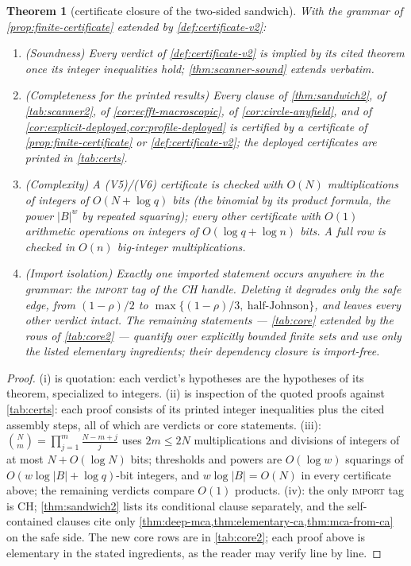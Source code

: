 \documentclass[11pt]{article}
\newtheorem{theorem}{Theorem}[section]
\theoremstyle{definition}
\theoremstyle{remark}
\newcommand{\B}{B}
\begin{document}
\begin{theorem}[certificate closure of the two-sided sandwich]\label{thm:T7-closure}
With the grammar of \cref{prop:finite-certificate} extended by \cref{def:certificate-v2}:
\begin{enumerate}[label=\textup{(\roman*)}]
\item \textup(Soundness\textup) Every verdict of \cref{def:certificate-v2} is implied by its cited theorem once its integer inequalities hold; \cref{thm:scanner-sound} extends verbatim.
\item \textup(Completeness for the printed results\textup) Every clause of \cref{thm:sandwich2}, of \cref{tab:scanner2}, of \cref{cor:ecfft-macroscopic}, of \cref{cor:circle-anyfield}, and of \cref{cor:explicit-deployed,cor:profile-deployed} is certified by a certificate of \cref{prop:finite-certificate} or \cref{def:certificate-v2}; the deployed certificates are printed in \cref{tab:certs}.
\item \textup(Complexity\textup) A \textup{(V5)}/\textup{(V6)} certificate is checked with $O(N)$ multiplications of integers of $O(N+\log q)$ bits \textup(the binomial by its product formula, the power $|\B|^w$ by repeated squaring\textup); every other certificate with $O(1)$ arithmetic operations on integers of $O(\log q+\log n)$ bits. A full row is checked in $O(n)$ big-integer multiplications.
\item \textup(Import isolation\textup) Exactly one imported statement occurs anywhere in the grammar: the \textup{\textsc{import}} tag of the CH handle. Deleting it degrades only the safe edge, from $(1-\rho)/2$ to $\max\{(1-\rho)/3,\ \text{half-Johnson}\}$, and leaves every other verdict intact. The remaining statements --- \cref{tab:core} extended by the rows of \cref{tab:core2} --- quantify over explicitly bounded finite sets and use only the listed elementary ingredients; their dependency closure is import-free.
\end{enumerate}
\end{theorem}

\begin{proof}
(i) is quotation: each verdict's hypotheses are the hypotheses of its theorem, specialized to integers. (ii) is inspection of the quoted proofs against \cref{tab:certs}: each proof consists of its printed integer inequalities plus the cited assembly steps, all of which are verdicts or core statements. (iii): $\binom Nm=\prod_{j=1}^m\frac{N-m+j}j$ uses $2m\le2N$ multiplications and divisions of integers of at most $N+O(\log N)$ bits; thresholds and powers are $O(\log w)$ squarings of $O(w\log|\B|+\log q)$-bit integers, and $w\log|\B|=O(N)$ in every certificate above; the remaining verdicts compare $O(1)$ products. (iv): the only \textup{\textsc{import}} tag is CH; \cref{thm:sandwich2} lists its conditional clause separately, and the self-contained clauses cite only \cref{thm:deep-mca,thm:elementary-ca,thm:mca-from-ca} on the safe side. The new core rows are in \cref{tab:core2}; each proof above is elementary in the stated ingredients, as the reader may verify line by line.
\end{proof}
\end{document}
